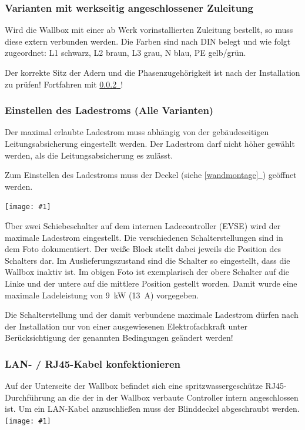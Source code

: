\documentclass[a4paper,10pt]{article}
\newcommand{\hint}[1]{\begin{tcolorbox}[colback=boxgray,colframe=black,coltext=
white,title=Hinweis]#1\end{tcolorbox}}
\newcommand{\gfx}[1]{\texttt{[image: \#1]}}
\newcommand*{\fullref}[1]{\hyperref[{#1}]{\ref*{#1}~\nameref*{#1}}}
\begin{document}
\begin{multicols*}{2}
	\subsubsection{Varianten mit werkseitig angeschlossener Zuleitung}
	Wird die Wallbox mit einer ab Werk vorinstallierten Zuleitung bestellt, so
	muss diese extern verbunden werden. Die Farben sind nach DIN belegt und wie
	folgt zugeordnet: L1 schwarz, L2 braun, L3 grau, N blau, PE gelb/grün.

	Der korrekte Sitz der Adern und die Phasenzugehörigkeit ist nach der
	Installation zu prüfen! Fortfahren mit \fullref{ladestrom_schalter}!

	\subsubsection{Einstellen des Ladestroms (Alle Varianten)}\label{ladestrom_schalter}
	Der maximal erlaubte Ladestrom muss abhängig von der gebäudeseitigen
	Leitungsabsicherung eingestellt werden. Der Ladestrom darf nicht höher gewählt
	werden, als die Leitungsabsicherung es zulässt.

	Zum Einstellen des Ladestroms muss der Deckel (siehe \fullref{wandmontage})
	geöffnet werden. 

	\gfx{./img_warp2/resized/warp2_current_configure_w_caption_600}

	Über zwei Schiebeschalter auf dem internen Ladecontroller (EVSE) wird der
	maximale Ladestrom eingestellt. Die verschiedenen Schalterstellungen sind in
	dem Foto dokumentiert. Der weiße Block stellt dabei jeweils die Position
	des Schalters dar. Im Auslieferungszustand sind die Schalter so eingestellt,
	dass die Wallbox inaktiv ist. Im obigen Foto ist exemplarisch der obere
	Schalter auf die Linke und der untere auf die mittlere Position gestellt worden. Damit wurde eine
	maximale Ladeleistung von \SI{9}{\kilo\watt} (\SI{13}{\ampere}) vorgegeben.
	\hint{Die Schalterstellung und der damit verbundene maximale Ladestrom dürfen nach der
		Installation nur von einer ausgewiesenen Elektrofachkraft unter
		Berücksichtigung der genannten Bedingungen geändert werden!}

	\subsubsection{LAN- / RJ45-Kabel konfektionieren}\label{ethernet}

	Auf der Unterseite der Wallbox befindet sich eine spritzwassergeschütze RJ45-Durchführung
	an die der in der Wallbox verbaute Controller intern
	angeschlossen ist. Um ein LAN-Kabel anzuschließen muss der Blinddeckel
	abgeschraubt werden.
	\gfx{./img_warp2/resized/warp2_ethernet3_circle_600} %


\end{multicols*}
\end{document}
